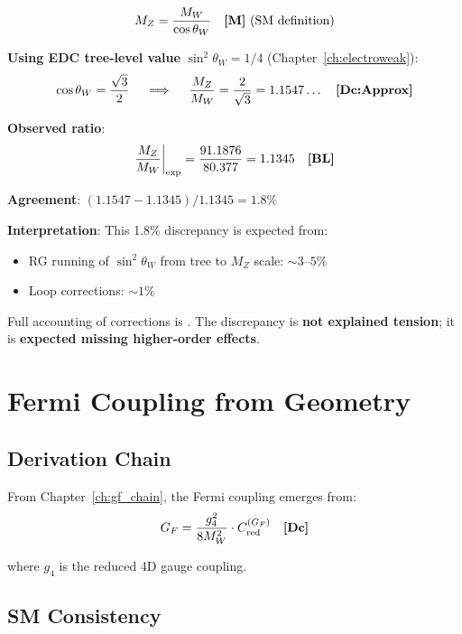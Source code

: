 \begin{equation}
M_Z = \frac{M_W}{\cos\theta_W} \quad \textbf{[M]}{} \text{ (SM definition)}
\end{equation}

\textbf{Using EDC tree-level value} $\sin^2\theta_W = 1/4$ (Chapter~\ref{ch:electroweak}):
\begin{equation}
\cos\theta_W = \frac{\sqrt{3}}{2} \quad \implies \quad
\frac{M_Z}{M_W} = \frac{2}{\sqrt{3}} = 1.1547\ldots \quad \textbf{[Dc:Approx]}
\end{equation}

\textbf{Observed ratio}:
\begin{equation}
\frac{M_Z}{M_W}\bigg|_{\text{exp}} = \frac{91.1876}{80.377} = 1.1345 \quad \textbf{[BL]}
\end{equation}

\textbf{Agreement}: $(1.1547 - 1.1345)/1.1345 = 1.8\%$

\textbf{Interpretation}: This 1.8\% discrepancy is expected from:
\begin{itemize}[nosep]
\item RG running of $\sin^2\theta_W$ from tree to $M_Z$ scale: $\sim 3$--$5\%$
\item Loop corrections: $\sim 1\%$
\end{itemize}
Full accounting of corrections is \tagOpen{}. The discrepancy is \textbf{not explained tension};
it is \textbf{expected missing higher-order effects}.

\section{Fermi Coupling from Geometry}
\label{sec:gf_geometry}

\subsection{Derivation Chain}

From Chapter~\ref{ch:gf_chain}, the Fermi coupling emerges from:
\begin{equation}
G_F = \frac{g_4^2}{8M_W^2} \cdot C_{\text{red}}^{(G_F)} \quad \textbf{[Dc]}
\end{equation}

where $g_4$ is the reduced 4D gauge coupling.

\subsection{SM Consistency}

